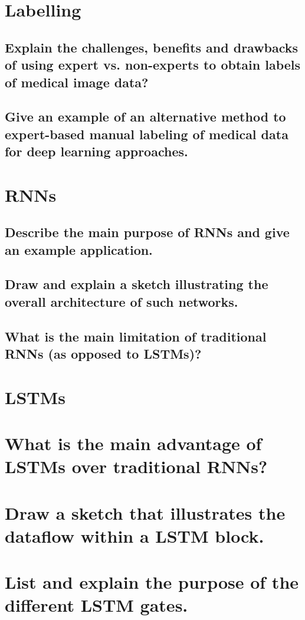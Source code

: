 \section{Labelling}

\subsection{Explain the challenges, benefits and drawbacks of using expert vs. non-experts to obtain labels of medical image data?}

\subsection{Give  an example of an alternative method to expert-based manual labeling of medical data for deep learning approaches.}

\section{RNNs}

\subsection{Describe the main purpose of RNNs and give an example application.}

\subsection{Draw and explain a sketch illustrating the overall  architecture of such networks.}

\subsection{What is the main limitation of traditional RNNs (as opposed to LSTMs)?}

\section{LSTMs}

\section{What is the main advantage of LSTMs over traditional RNNs?}

\section{Draw a sketch that illustrates the dataflow within a LSTM block.}

\section{List and explain the purpose of the different LSTM gates.}

